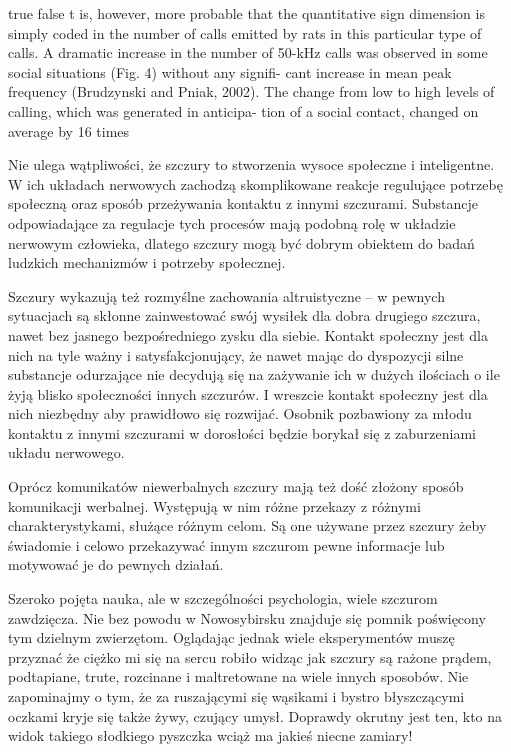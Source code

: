 \documentclass{psychol}
\begin{document}
\ifx true false
t is, however, more
probable that the quantitative sign dimension is
simply coded in the number of calls emitted by rats
in this particular type of calls. A dramatic increase
in the number of 50-kHz calls was observed in
some social situations (Fig. 4) without any signifi-
cant increase in mean peak frequency (Brudzynski
and Pniak, 2002). The change from low to high
levels of calling, which was generated in anticipa-
tion of a social contact, changed on average by 16
times
\fi


Nie ulega wątpliwości, że szczury to stworzenia wysoce społeczne i inteligentne. W ich układach nerwowych zachodzą skomplikowane reakcje regulujące potrzebę społeczną oraz sposób przeżywania kontaktu z innymi szczurami. Substancje odpowiadające za regulacje tych procesów mają podobną rolę w układzie nerwowym człowieka, dlatego szczury mogą być dobrym obiektem do badań ludzkich mechanizmów i potrzeby społecznej.

Szczury wykazują też rozmyślne zachowania altruistyczne -- w pewnych sytuacjach są skłonne zainwestować swój wysiłek dla dobra drugiego szczura, nawet bez jasnego bezpośredniego zysku dla siebie. Kontakt społeczny jest dla nich na tyle ważny i satysfakcjonujący, że nawet mając do dyspozycji silne substancje odurzające nie decydują się na zażywanie ich w dużych ilościach o ile żyją blisko społeczności innych szczurów. I wreszcie kontakt społeczny jest dla nich niezbędny aby prawidłowo się rozwijać. Osobnik pozbawiony za młodu kontaktu z innymi szczurami w dorosłości będzie borykał się z zaburzeniami układu nerwowego.

Oprócz komunikatów niewerbalnych szczury mają też dość złożony sposób komunikacji werbalnej. Występują w nim różne przekazy z różnymi charakterystykami, służące różnym celom. Są one używane przez szczury żeby świadomie i celowo przekazywać innym szczurom pewne informacje lub motywować je do pewnych działań.

Szeroko pojęta nauka, ale w szczególności psychologia, wiele szczurom zawdzięcza. Nie bez powodu w Nowosybirsku znajduje się pomnik poświęcony tym dzielnym zwierzętom. Oglądając jednak wiele eksperymentów muszę przyznać że ciężko mi się na sercu robiło widząc jak szczury są rażone prądem, podtapiane, trute, rozcinane i maltretowane na wiele innych sposobów. Nie zapominajmy o tym, że za ruszającymi się wąsikami i bystro błyszczącymi oczkami kryje się także żywy, czujący umysł. Doprawdy okrutny jest ten, kto na widok takiego słodkiego pyszczka wciąż ma jakieś niecne zamiary!
\end{document}
